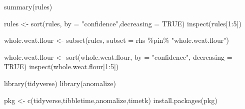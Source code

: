 \documentclass[
]{article}
\newenvironment{Shaded}{\begin{snugshade}}{\end{snugshade}}
\newcommand{\AttributeTok}[1]{\textcolor[rgb]{0.77,0.63,0.00}{#1}}
\newcommand{\ConstantTok}[1]{\textcolor[rgb]{0.00,0.00,0.00}{#1}}
\newcommand{\DecValTok}[1]{\textcolor[rgb]{0.00,0.00,0.81}{#1}}
\newcommand{\FunctionTok}[1]{\textcolor[rgb]{0.00,0.00,0.00}{#1}}
\newcommand{\NormalTok}[1]{#1}
\newcommand{\OtherTok}[1]{\textcolor[rgb]{0.56,0.35,0.01}{#1}}
\newcommand{\SpecialCharTok}[1]{\textcolor[rgb]{0.00,0.00,0.00}{#1}}
\newcommand{\StringTok}[1]{\textcolor[rgb]{0.31,0.60,0.02}{#1}}
\begin{document}
\begin{Shaded}
\begin{Highlighting}[]
\FunctionTok{summary}\NormalTok{(rules)}
\end{Highlighting}
\end{Shaded}

\begin{Shaded}
\begin{Highlighting}[]
\NormalTok{rules }\OtherTok{\textless{}{-}} \FunctionTok{sort}\NormalTok{(rules, }\AttributeTok{by =} \StringTok{"confidence"}\NormalTok{,}\AttributeTok{decreasing =} \ConstantTok{TRUE}\NormalTok{)}
\FunctionTok{inspect}\NormalTok{(rules[}\DecValTok{1}\SpecialCharTok{:}\DecValTok{5}\NormalTok{])}
\end{Highlighting}
\end{Shaded}

\begin{Shaded}
\begin{Highlighting}[]
\NormalTok{whole.weat.flour }\OtherTok{\textless{}{-}} \FunctionTok{subset}\NormalTok{(rules, }\AttributeTok{subset =}\NormalTok{ rhs }\SpecialCharTok{\%pin\%} \StringTok{"whole.weat.flour"}\NormalTok{)}

\NormalTok{whole.weat.flour }\OtherTok{\textless{}{-}} \FunctionTok{sort}\NormalTok{(whole.weat.flour, }\AttributeTok{by =} \StringTok{"confidence"}\NormalTok{, }\AttributeTok{decreasing =} \ConstantTok{TRUE}\NormalTok{)}
\FunctionTok{inspect}\NormalTok{(whole.weat.flour[}\DecValTok{1}\SpecialCharTok{:}\DecValTok{5}\NormalTok{])}
\end{Highlighting}
\end{Shaded}

\begin{Shaded}
\begin{Highlighting}[]
\FunctionTok{library}\NormalTok{(tidyverse)}
\FunctionTok{library}\NormalTok{(anomalize)}
\end{Highlighting}
\end{Shaded}

\begin{Shaded}
\begin{Highlighting}[]
\NormalTok{pkg }\OtherTok{\textless{}{-}} \FunctionTok{c}\NormalTok{(}\StringTok{\textquotesingle{}tidyverse\textquotesingle{}}\NormalTok{,}\StringTok{\textquotesingle{}tibbletime\textquotesingle{}}\NormalTok{,}\StringTok{\textquotesingle{}anomalize\textquotesingle{}}\NormalTok{,}\StringTok{\textquotesingle{}timetk\textquotesingle{}}\NormalTok{)}
\FunctionTok{install.packages}\NormalTok{(pkg)}
\end{Highlighting}
\end{Shaded}
\end{document}
